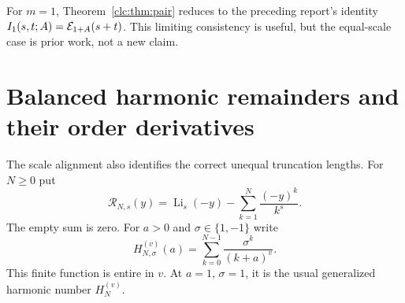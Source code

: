 \documentclass[11pt,a4paper]{article}
\numberwithin{equation}{section}
\theoremstyle{definition}\newtheorem{definition}[theorem]{Definition}
\theoremstyle{remark}\newtheorem{remark}[theorem]{Remark}
\DeclareMathOperator{\Li}{Li}
\begin{document}
For $m=1$, Theorem~\ref{clc:thm:pair} reduces to the preceding report's
identity $I_1(s,t;A)=\mathcal E_{1+A}(s+t)$. This limiting consistency is useful,
but the equal-scale case is prior work, not a new claim.

\section{Balanced harmonic remainders and their order derivatives}
\label{clc:sec:harmonic}

The scale alignment also identifies the correct unequal truncation
lengths. For $N\ge0$ put
\begin{equation}\label{clc:eq:R}
 \mathcal R_{N,s}(y)=\Li_s(-y)-\sum_{k=1}^{N}\frac{(-y)^k}{k^s}.
\end{equation}
The empty sum is zero. For $a>0$ and $\sigma\in\{1,-1\}$ write
\begin{equation}\label{clc:eq:Hcolored}
 H_{N,\sigma}^{(v)}(a)=\sum_{k=0}^{N-1}\frac{\sigma^k}{(k+a)^v}.
\end{equation}
This finite function is entire in $v$. At $a=1$, $\sigma=1$, it is the
usual generalized harmonic number $H_N^{(v)}$.
\end{document}

